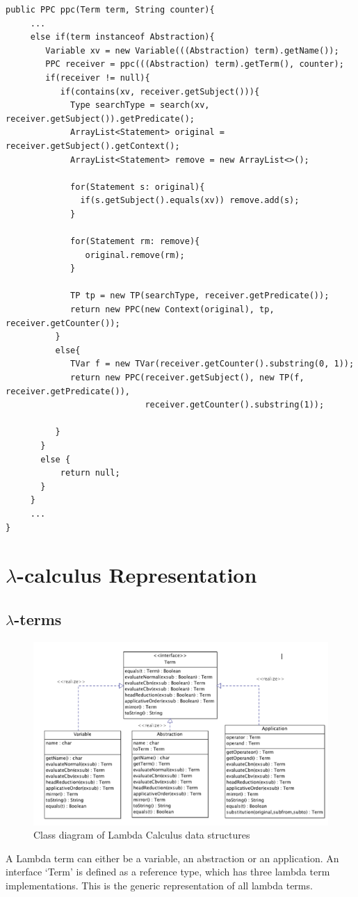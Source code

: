 \documentclass[a4paper,11pt,twoside]{report}
\begin{document}
\begin{verbatim}
public PPC ppc(Term term, String counter){
     ...
     else if(term instanceof Abstraction){
        Variable xv = new Variable(((Abstraction) term).getName());
        PPC receiver = ppc(((Abstraction) term).getTerm(), counter);
        if(receiver != null){
           if(contains(xv, receiver.getSubject())){
             Type searchType = search(xv, receiver.getSubject()).getPredicate();
             ArrayList<Statement> original = receiver.getSubject().getContext();
             ArrayList<Statement> remove = new ArrayList<>();

             for(Statement s: original){
               if(s.getSubject().equals(xv)) remove.add(s);
             }

             for(Statement rm: remove){
                original.remove(rm);
             }

             TP tp = new TP(searchType, receiver.getPredicate());
             return new PPC(new Context(original), tp, receiver.getCounter());
          }
          else{
             TVar f = new TVar(receiver.getCounter().substring(0, 1));
             return new PPC(receiver.getSubject(), new TP(f, receiver.getPredicate()),
                            receiver.getCounter().substring(1));

          }
       }
       else {
           return null;
       }
     }
     ...
}
\end{verbatim}



 



\section{$\lambda$-calculus Representation}
\subsection{$\lambda$-terms}
\begin{figure}
\centering
\includegraphics[scale=0.7]{Term}
\caption{Class diagram of Lambda Calculus data structures}
\label{fig:term1}
\end{figure}
A Lambda term can either be a variable, an abstraction or an application. An interface `Term' is defined as a reference type, which has three lambda term implementations. This is the generic representation of all lambda terms.
\end{document}
